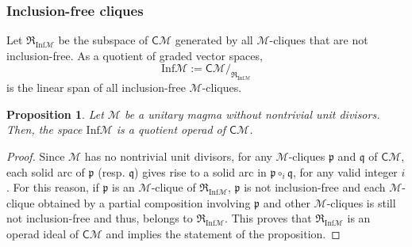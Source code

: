 \documentclass[10pt,reqno]{amsart}
\numberwithin{equation}{subsection}
\newtheorem{Proposition}[Theorem]{Proposition}
\newcommand{\Mca}{\mathcal{M}}
\newcommand{\Pfr}{\mathfrak{p}}
\newcommand{\Qfr}{\mathfrak{q}}
\newcommand{\Cli}{\mathsf{C}}
\newcommand{\Inf}{\mathrm{Inf}}
\newcommand{\Rel}{\mathfrak{R}}
\begin{document}
\subsubsection{Inclusion-free cliques}%
\label{subsubsec:quotient_Cli_M_Inf}
Let $\Rel_{\Inf\Mca}$ be the subspace of $\Cli\Mca$ generated by all
$\Mca$-cliques that are not inclusion-free.  As a quotient of graded
vector spaces,
\begin{equation}
    \Inf\Mca := \Cli\Mca/_{\Rel_{\Inf\Mca}}
\end{equation}
is the linear span of all inclusion-free $\Mca$-cliques.
\medskip

\begin{Proposition} \label{prop:quotient_Cli_M_inclusion_free}
    Let $\Mca$ be a unitary magma without nontrivial unit divisors.
    Then, the space $\Inf\Mca$ is a quotient operad of $\Cli\Mca$.
\end{Proposition}
\begin{proof}
    Since $\Mca$ has no nontrivial unit divisors, for any $\Mca$-cliques
    $\Pfr$ and $\Qfr$ of $\Cli\Mca$, each solid arc of $\Pfr$ (resp.
    $\Qfr$) gives rise to a solid arc in $\Pfr \circ_i \Qfr$, for any
    valid integer $i$. For this reason, if $\Pfr$ is an $\Mca$-clique of
    $\Rel_{\Inf\Mca}$, $\Pfr$ is not inclusion-free and each
    $\Mca$-clique obtained by a partial composition involving $\Pfr$ and
    other $\Mca$-cliques is still not inclusion-free and thus, belongs
    to $\Rel_{\Inf\Mca}$. This proves that $\Rel_{\Inf\Mca}$ is an
    operad ideal of $\Cli\Mca$ and implies the statement of the
    proposition.
\end{proof}
\medskip
\end{document}
